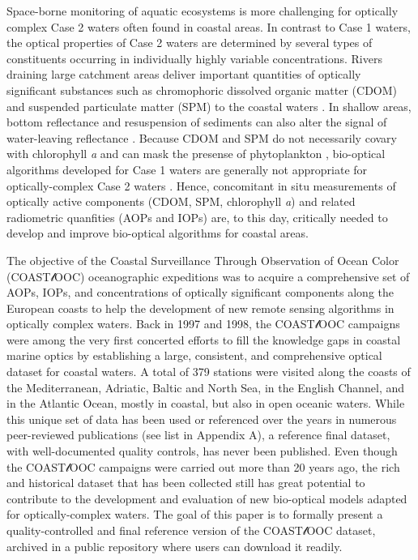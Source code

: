 \documentclass[essd, manuscript]{copernicus}
\begin{document}
Space-borne monitoring of aquatic ecosystems is more challenging for optically complex Case 2 waters \citep{Morel1977} often found in coastal areas. In contrast to Case 1 waters, the optical properties of Case 2 waters are determined by several types of constituents occurring in individually highly variable concentrations. Rivers draining large catchment areas deliver important quantities of optically significant substances such as chromophoric dissolved organic matter (CDOM) and suspended particulate matter (SPM) to the coastal waters \citep{Hedges1997, Cole2007, Massicotte2017}. In shallow areas, bottom reflectance and resuspension of sediments can also alter the signal of water-leaving reflectance \citep{Lee1998}. Because CDOM and SPM do not necessarily covary with chlorophyll \textit{a} and can mask the presense of phytoplankton \citep{ioccg2000}, bio-optical algorithms developed for Case 1 waters are generally not appropriate for optically-complex Case 2 waters \citep{Gordon1983}. Hence, concomitant in situ measurements of optically active components (CDOM, SPM, chlorophyll \textit{a}) and related radiometric quanfities (AOPs and IOPs) are, to this day, critically needed to develop and improve bio-optical algorithms for coastal areas.

The objective of the Coastal Surveillance Through Observation of Ocean Color (COAST$\mathscr{l}$OOC) oceanographic expeditions was to acquire a comprehensive set of AOPs, IOPs, and concentrations of optically significant components along the European coasts to help the development of new remote sensing algorithms in optically complex waters. Back in 1997 and 1998, the COAST$\mathscr{l}$OOC campaigns were among the very first concerted efforts to fill the knowledge gaps in coastal marine optics by establishing a large, consistent, and comprehensive optical dataset for coastal waters. A total of 379 stations were visited along the coasts of the Mediterranean, Adriatic, Baltic and North Sea, in the English Channel, and in the Atlantic Ocean, mostly in coastal, but also in open oceanic waters. While this unique set of data has been used or referenced over the years in numerous peer-reviewed publications  (see list in Appendix A), a reference final dataset, with well-documented quality controls, has never been published. Even though the COAST$\mathscr{l}$OOC campaigns were carried out more than 20 years ago, the rich and historical dataset that has been collected still has great potential to contribute to the development and evaluation of new bio-optical models adapted for optically-complex waters. The goal of this paper is to formally present a quality-controlled and final reference version of the COAST$\mathscr{l}$OOC dataset, archived in a public repository where users can download it readily.
\end{document}
